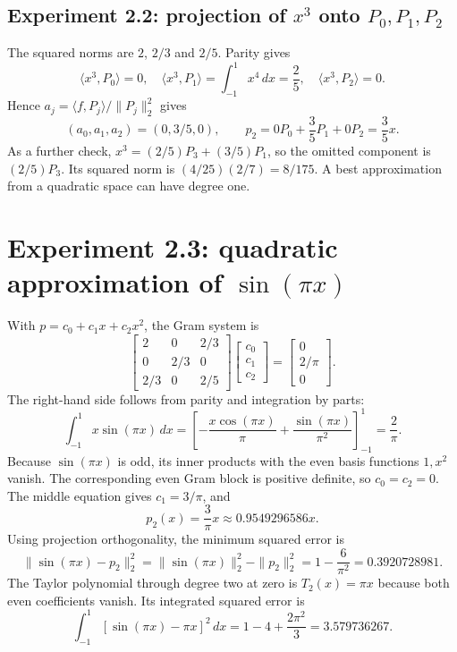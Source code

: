 \documentclass[11pt,a4paper]{article}
\begin{document}
\subsection{Experiment 2.2: projection of $x^3$ onto $P_0,P_1,P_2$}
The squared norms are $2$, $2/3$ and $2/5$. Parity gives
\[
\langle x^3,P_0\rangle=0,\quad
\langle x^3,P_1\rangle=\int_{-1}^1x^4\,dx=\frac25,\quad
\langle x^3,P_2\rangle=0.
\]
Hence $a_j=\langle f,P_j\rangle/\|P_j\|_2^2$ gives
\[
(a_0,a_1,a_2)=(0,3/5,0),\qquad
\boxed{p_2=0P_0+\frac35P_1+0P_2=\frac35x.}
\]
As a further check, $x^3=(2/5)P_3+(3/5)P_1$, so the omitted component is $(2/5)P_3$. Its squared norm is $(4/25)(2/7)=8/175$. A best approximation from a quadratic space can have degree one.

\clearpage
\section{Experiment 2.3: quadratic approximation of $\sin(\pi x)$}
With $p=c_0+c_1x+c_2x^2$, the Gram system is
\[
\begin{bmatrix}2&0&2/3\\0&2/3&0\\2/3&0&2/5\end{bmatrix}
\begin{bmatrix}c_0\\c_1\\c_2\end{bmatrix}
=\begin{bmatrix}0\\2/\pi\\0\end{bmatrix}.
\]
The right-hand side follows from parity and integration by parts:
\[
\int_{-1}^1x\sin(\pi x)\,dx
=\left[-\frac{x\cos(\pi x)}{\pi}+\frac{\sin(\pi x)}{\pi^2}\right]_{-1}^1
=\frac2\pi.
\]
Because $\sin(\pi x)$ is odd, its inner products with the even basis functions $1,x^2$ vanish. The corresponding even Gram block is positive definite, so $c_0=c_2=0$. The middle equation gives $c_1=3/\pi$, and
\[
\boxed{p_2(x)=\frac3\pi x\approx0.9549296586x.}
\]
Using projection orthogonality, the minimum squared error is
\[
\|\sin(\pi x)-p_2\|_2^2=\|\sin(\pi x)\|_2^2-\|p_2\|_2^2
=1-\frac6{\pi^2}=0.3920728981.
\]
The Taylor polynomial through degree two at zero is $T_2(x)=\pi x$ because both even coefficients vanish. Its integrated squared error is
\[
\int_{-1}^1[\sin(\pi x)-\pi x]^2\,dx
=1-4+\frac{2\pi^2}{3}=3.579736267.
\]
\end{document}
